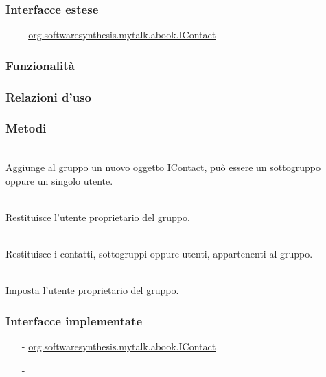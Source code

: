 \subsubsection*{Interfacce estese}
\begin{itemize}[noitemsep,nolistsep]
  \item[-] \hyperref[IContact]{\ttfamily{}org.softwaresynthesis.mytalk.abook.IContact}
\end{itemize}

\subsubsection*{Funzionalità}

\subsubsection*{Relazioni d'uso}

\subsubsection*{Metodi}
\begin{description}
	\item{}\\
Aggiunge al gruppo un nuovo oggetto IContact, può essere un sottogruppo oppure un singolo utente.
	\item{}\\
Restituisce l'utente proprietario del gruppo.
	\item{}\\
Restituisce i contatti, sottogruppi oppure utenti, appartenenti al gruppo.
	\item{}\\
Imposta l'utente proprietario del gruppo.
\end{description}


\subsubsection*{Interfacce implementate}
\begin{itemize}[noitemsep,nolistsep]
  \item[-] \hyperref[IContact]{\ttfamily{}org.softwaresynthesis.mytalk.abook.IContact}
  \item[-] 
\end{itemize}


